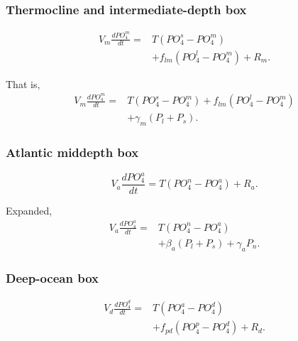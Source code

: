 \documentclass[11pt]{article}
\begin{document}
\subsubsection{Thermocline and intermediate-depth box}

\begin{equation}
\begin{split}
V_m\frac{dPO_4^m}{dt}
={}&
T
\left(
PO_4^s-PO_4^m
\right)
\\
&+
f_{lm}
\left(
PO_4^l-PO_4^m
\right)
+
R_m.
\end{split}
\label{eq:seven_po4_m}
\end{equation}

That is,
\begin{equation}
\begin{split}
V_m\frac{dPO_4^m}{dt}
={}&
T
\left(
PO_4^s-PO_4^m
\right)
+
f_{lm}
\left(
PO_4^l-PO_4^m
\right)
\\
&+
\gamma_m
\left(
P_l+P_s
\right).
\end{split}
\label{eq:seven_po4_m_expanded}
\end{equation}

\subsubsection{Atlantic middepth box}

\begin{equation}
V_a\frac{dPO_4^a}{dt}
=
T
\left(
PO_4^n-PO_4^a
\right)
+
R_a.
\label{eq:seven_po4_a}
\end{equation}

Expanded,
\begin{equation}
\begin{split}
V_a\frac{dPO_4^a}{dt}
={}&
T
\left(
PO_4^n-PO_4^a
\right)
\\
&+
\beta_a
\left(
P_l+P_s
\right)
+
\gamma_aP_n.
\end{split}
\label{eq:seven_po4_a_expanded}
\end{equation}

\subsubsection{Deep-ocean box}

\begin{equation}
\begin{split}
V_d\frac{dPO_4^d}{dt}
={}&
T
\left(
PO_4^a-PO_4^d
\right)
\\
&+
f_{pd}
\left(
PO_4^p-PO_4^d
\right)
+
R_d.
\end{split}
\label{eq:seven_po4_d}
\end{equation}
\end{document}
